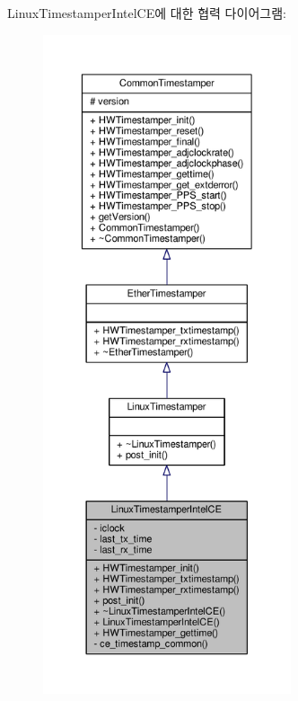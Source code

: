 Linux\+Timestamper\+Intel\+C\+E에 대한 협력 다이어그램\+:
\nopagebreak
\begin{figure}[H]
\begin{center}
\leavevmode
\includegraphics[height=550pt]{class_linux_timestamper_intel_c_e__coll__graph}
\end{center}
\end{figure}
